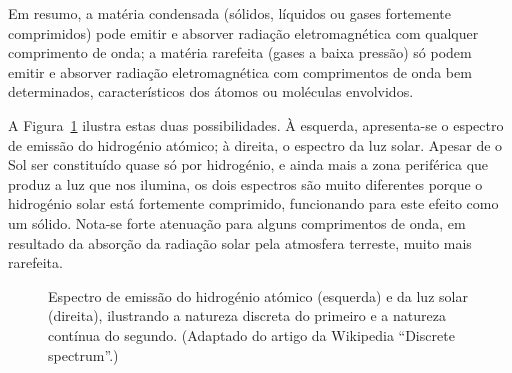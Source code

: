Em resumo, a matéria condensada (sólidos, líquidos ou gases fortemente
comprimidos) pode emitir e absorver radiação eletromagnética com qualquer
comprimento de onda; a matéria rarefeita (gases a baixa pressão) só podem emitir
e absorver radiação eletromagnética com comprimentos de onda bem determinados,
característicos dos átomos ou moléculas envolvidos.

A Figura~\ref{fig:spectrums} ilustra estas duas possibilidades. À esquerda,
apresenta-se o espectro de emissão do hidrogénio atómico; à direita, o espectro
da luz solar. Apesar de o Sol ser constituído quase só por hidrogénio, e ainda
mais a zona periférica que produz a luz que nos ilumina, os dois
espectros são muito diferentes porque o hidrogénio solar está fortemente
comprimido, funcionando para este efeito como um sólido. Nota-se forte atenuação
para alguns comprimentos de onda, em resultado da absorção da radiação solar
pela atmosfera terreste, muito mais rarefeita.
\begin{figure}[htb]
{\centering
    \hfill
}\par
\caption{Espectro de emissão do hidrogénio atómico (esquerda) e da luz solar
(direita), ilustrando a natureza discreta do primeiro e a natureza contínua do
segundo. (Adaptado do artigo da Wikipedia ``Discrete spectrum''.)
\label{fig:spectrums}}
\end{figure}

